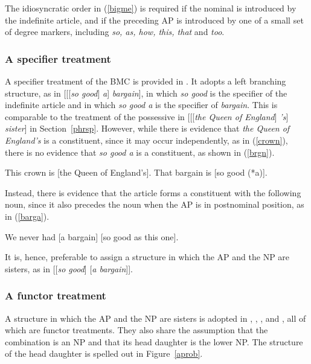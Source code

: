 \documentclass[output=paper
	        ,collection
	        ,collectionchapter
 	        ,biblatex
                ,babelshorthands
                ,newtxmath
                ,draftmode
                ,colorlinks, citecolor=brown
]{langscibook}
\begin{document}
\noindent
The idiosyncratic order in (\ref{bigme}) is required if the nominal is introduced 
by the indefinite article, and if the preceding AP is introduced by one of a small 
set of degree markers, including \emph{so, as, how, this, that} and \emph{too}. 


\subsubsection{A specifier treatment} 


A specifier treatment of the BMC is provided in \citet[201]{GS00}. It adopts  
a left branching structure, as in [[[\emph{so good}] \emph{a}] \emph{bargain}], 
in which \emph{so good} is the specifier of the indefinite article and in which 
\emph{so good a} is the specifier of \emph{bargain}. 
This is comparable to the treatment of the possessive in 
[[[\emph{the Queen of England}] \emph{'s}] \emph{sister}] in Section~\ref{phrsp}.  
However, while there is evidence that \emph{the Queen of England's} is a constituent,
since it may occur independently, as in (\ref{crown}), there is no evidence that 
\emph{so good a} is a constituent, as shown in (\ref{brgn}).

\begin{exe} 
\ex\label{crown}  This crown is [the Queen of England's].
\ex\label{brgn}   That bargain is [so good (*a)]. 
\end{exe} 

\noindent
Instead, there is evidence that the article forms a constituent with the following noun, 
since it also precedes the noun when the AP is in postnominal position, as in (\ref{barga}). 

\begin{exe} 
\ex\label{barga}  We never had [a bargain] [so good as this one].
\end{exe} 

\noindent
It is, hence, preferable to assign a structure in which the AP and the NP are sisters, as in  
[[\emph{so good}] [\emph{a bargain}]]. 


\subsubsection{A functor treatment} 


A structure in which the AP and the NP are sisters is adopted in 
\citet{VanEynde07}, \citet{KimSells11}, \citet{KaySag12}, 
\citet{ArnoldSadler14} and \citet{VanEynde18}, all of which are functor treatments. 
They also share the assumption that the combination is an NP and that its head daughter is 
the lower NP. The structure of the head daughter is spelled out in Figure~\ref{aprob}. 
\end{document}
